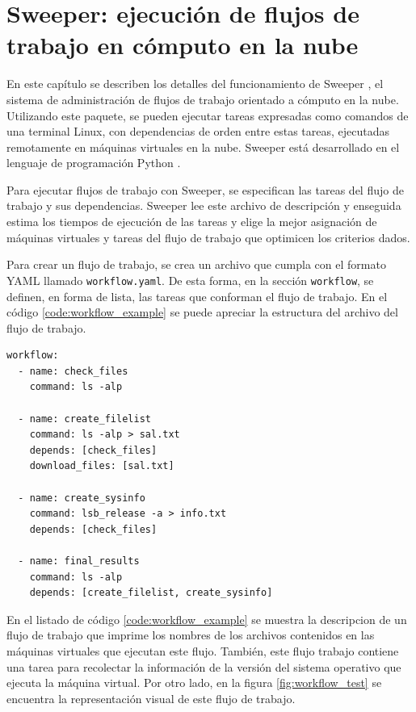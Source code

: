 \chapter[Sweeper]{Sweeper: ejecución de flujos de trabajo en cómputo en la nube}
\label{chap:sweeper}

En este capítulo se describen los detalles del funcionamiento de Sweeper \cite{dominofire2015sweeper}, el sistema de administración de flujos de trabajo orientado a cómputo en la nube. Utilizando este paquete, se pueden ejecutar tareas expresadas como comandos de una terminal Linux, con dependencias de orden entre estas tareas, ejecutadas remotamente en m\'aquinas virtuales en la nube. Sweeper está desarrollado en el lenguaje de programación Python \cite{python3}.

Para ejecutar flujos de trabajo con Sweeper, se especifican las tareas del flujo de trabajo y sus dependencias. Sweeper lee este archivo de descripción y enseguida estima los tiempos de ejecución de las tareas y elige la mejor asignación de máquinas virtuales y tareas del flujo de trabajo que optimicen los criterios dados.

Para crear un flujo de trabajo, se crea un archivo que cumpla con el formato YAML \cite{dot2015yaml} llamado \texttt{workflow.yaml}. De esta forma, en la sección \texttt{workflow}, se definen, en forma de lista, las tareas que conforman el flujo de trabajo. En el código \ref{code:workflow_example} se puede apreciar la estructura del archivo del flujo de trabajo.  

\begin{lstlisting}[label={code:workflow_example},caption={Flujo de trabajo de ejemplo.},float]
workflow:
  - name: check_files
    command: ls -alp

  - name: create_filelist
    command: ls -alp > sal.txt
    depends: [check_files]
    download_files: [sal.txt]

  - name: create_sysinfo
    command: lsb_release -a > info.txt
    depends: [check_files]

  - name: final_results
    command: ls -alp
    depends: [create_filelist, create_sysinfo]
\end{lstlisting}

En el listado de código \ref{code:workflow_example} se muestra la descripcion de un flujo de trabajo que imprime los nombres de los archivos contenidos en las máquinas virtuales que ejecutan este flujo. También, este flujo trabajo contiene una tarea para recolectar la información de la versión del sistema operativo que ejecuta la máquina virtual. Por otro lado, en la figura \ref{fig:workflow_test} se encuentra la representación visual de este flujo de trabajo. 

